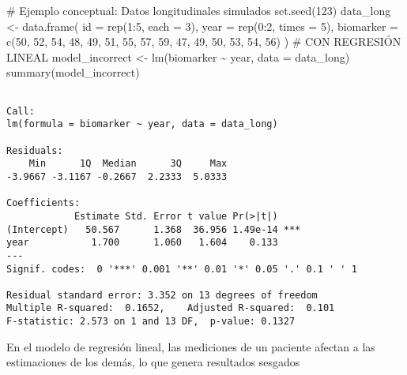 \documentclass[
  letterpaper,
  DIV=11,
  numbers=noendperiod]{scrreprt}
\newenvironment{Shaded}{\begin{snugshade}}{\end{snugshade}}
\newcommand{\AttributeTok}[1]{\textcolor[rgb]{0.40,0.45,0.13}{#1}}
\newcommand{\CommentTok}[1]{\textcolor[rgb]{0.37,0.37,0.37}{#1}}
\newcommand{\DecValTok}[1]{\textcolor[rgb]{0.68,0.00,0.00}{#1}}
\newcommand{\FunctionTok}[1]{\textcolor[rgb]{0.28,0.35,0.67}{#1}}
\newcommand{\NormalTok}[1]{\textcolor[rgb]{0.00,0.23,0.31}{#1}}
\newcommand{\OtherTok}[1]{\textcolor[rgb]{0.00,0.23,0.31}{#1}}
\newcommand{\SpecialCharTok}[1]{\textcolor[rgb]{0.37,0.37,0.37}{#1}}
\begin{document}
\begin{Shaded}
\begin{Highlighting}[]
\CommentTok{\# Ejemplo conceptual: Datos longitudinales simulados}
\FunctionTok{set.seed}\NormalTok{(}\DecValTok{123}\NormalTok{)}
\NormalTok{data\_long }\OtherTok{\textless{}{-}} \FunctionTok{data.frame}\NormalTok{(}
  \AttributeTok{id =} \FunctionTok{rep}\NormalTok{(}\DecValTok{1}\SpecialCharTok{:}\DecValTok{5}\NormalTok{, }\AttributeTok{each =} \DecValTok{3}\NormalTok{),}
  \AttributeTok{year =} \FunctionTok{rep}\NormalTok{(}\DecValTok{0}\SpecialCharTok{:}\DecValTok{2}\NormalTok{, }\AttributeTok{times =} \DecValTok{5}\NormalTok{),}
  \AttributeTok{biomarker =} \FunctionTok{c}\NormalTok{(}\DecValTok{50}\NormalTok{, }\DecValTok{52}\NormalTok{, }\DecValTok{54}\NormalTok{, }\DecValTok{48}\NormalTok{, }\DecValTok{49}\NormalTok{, }\DecValTok{51}\NormalTok{, }\DecValTok{55}\NormalTok{, }\DecValTok{57}\NormalTok{, }\DecValTok{59}\NormalTok{, }\DecValTok{47}\NormalTok{, }\DecValTok{49}\NormalTok{, }\DecValTok{50}\NormalTok{, }\DecValTok{53}\NormalTok{, }\DecValTok{54}\NormalTok{, }\DecValTok{56}\NormalTok{)}
\NormalTok{)}
\CommentTok{\# CON REGRESIÓN LINEAL}
\NormalTok{model\_incorrect }\OtherTok{\textless{}{-}} \FunctionTok{lm}\NormalTok{(biomarker }\SpecialCharTok{\textasciitilde{}}\NormalTok{ year, }\AttributeTok{data =}\NormalTok{ data\_long)}
\FunctionTok{summary}\NormalTok{(model\_incorrect)}
\end{Highlighting}
\end{Shaded}

\begin{verbatim}

Call:
lm(formula = biomarker ~ year, data = data_long)

Residuals:
    Min      1Q  Median      3Q     Max 
-3.9667 -3.1167 -0.2667  2.2333  5.0333 

Coefficients:
            Estimate Std. Error t value Pr(>|t|)    
(Intercept)   50.567      1.368  36.956 1.49e-14 ***
year           1.700      1.060   1.604    0.133    
---
Signif. codes:  0 '***' 0.001 '**' 0.01 '*' 0.05 '.' 0.1 ' ' 1

Residual standard error: 3.352 on 13 degrees of freedom
Multiple R-squared:  0.1652,    Adjusted R-squared:  0.101 
F-statistic: 2.573 on 1 and 13 DF,  p-value: 0.1327
\end{verbatim}

En el modelo de regresión lineal, las mediciones de un paciente afectan
a las estimaciones de los demás, lo que genera resultados sesgados
\end{document}
